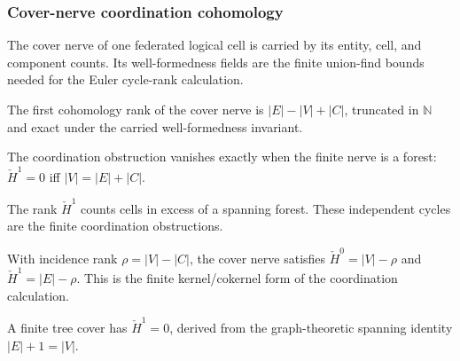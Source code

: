 \subsubsection{Cover-nerve coordination cohomology}

\begin{proposition}\label{thm:cover-nerve}\leanok{}
The cover nerve of one federated logical cell is carried by its entity,
cell, and component counts. Its well-formedness fields are the finite
union-find bounds needed for the Euler cycle-rank calculation.
\end{proposition}

\begin{proposition}\label{thm:coordination-h1rank}\leanok{}
The first cohomology rank of the cover nerve is
$|E|-|V|+|C|$, truncated in $\mathbb N$ and exact under the carried
well-formedness invariant.
\end{proposition}

\begin{theorem}\label{thm:coordination-h1-iff-forest}\leanok{}
The coordination obstruction vanishes exactly when the finite nerve is a
forest: $\check H^1=0$ iff $|V|=|E|+|C|$.
\end{theorem}

\begin{theorem}[Rank $\check H^1$ $=$ coordination cost]\label{thm:coordination-cost}\leanok{}
The rank $\check H^1$ counts cells in excess of a spanning forest. These
independent cycles are the finite coordination obstructions.
\end{theorem}

\begin{theorem}[The Laplacian dual: $\check H^0=\ker$, $\check H^1=\mathrm{coker}$]\label{thm:coordination-laplacian-dual}\leanok{}
With incidence rank $\rho=|V|-|C|$, the cover nerve satisfies
$\check H^0=|V|-\rho$ and $\check H^1=|E|-\rho$. This is the finite
kernel/cokernel form of the coordination calculation.
\end{theorem}

\begin{theorem}\label{thm:tree-coordination-free}\leanok{}
A finite tree cover has $\check H^1=0$, derived from the graph-theoretic
spanning identity $|E|+1=|V|$.
\end{theorem}
